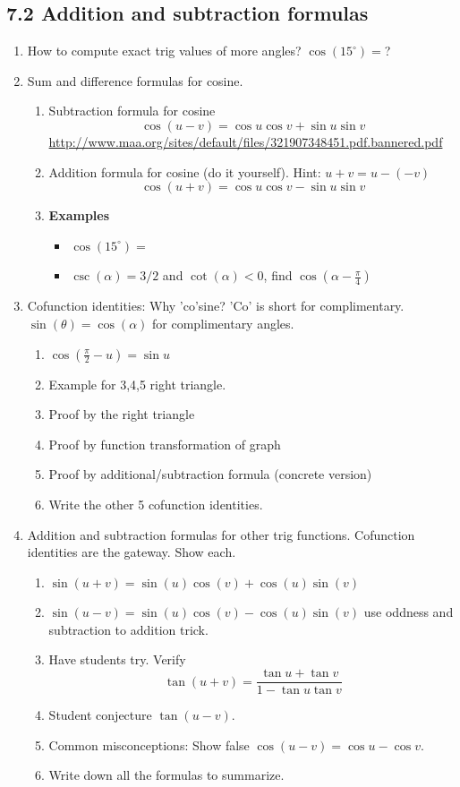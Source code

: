 \documentclass{article}
\begin{document}
\subsection{7.2 Addition and subtraction formulas}
\begin{enumerate}

\item How to compute exact trig values of more angles? $\cos (15^\circ)=$?

\item Sum and difference formulas for cosine.
\begin{enumerate}
\item Subtraction formula for cosine
$$
\cos(u-v) = \cos u \cos v+\sin u \sin v
$$
\url{http://www.maa.org/sites/default/files/321907348451.pdf.bannered.pdf}
\item Addition formula for cosine (do it yourself). Hint: $u+v=u-(-v)$
$$
\cos(u+v) = \cos u \cos v-\sin u \sin v
$$
\item {\bf Examples} 
\begin{itemize}
\item $\cos(15^\circ)=$
\item $\csc (\alpha) = 3/2$ and $\cot(\alpha) <0$, find $\cos(\alpha - \frac{\pi}{4})$
\end{itemize}
\end{enumerate}

\item Cofunction identities: Why 'co'sine? 'Co' is short for complimentary. $\sin(\theta)=\cos(\alpha)$ for complimentary angles.
\begin{enumerate}
\item $\cos(\frac{\pi}{2}-u) = \sin u$
\item Example for 3,4,5 right triangle.
\item Proof by the right triangle
\item Proof by function transformation of graph
\item Proof by additional/subtraction formula (concrete version)
\item Write the other 5 cofunction identities.
\end{enumerate}

\item Addition and subtraction formulas for other trig functions. Cofunction identities are the gateway. Show each.
\begin{enumerate}
\item $\sin (u+v)=\sin(u)\cos(v)+\cos(u)\sin(v)$
\item $\sin (u-v)=\sin(u)\cos(v)-\cos(u)\sin(v)$ use oddness and subtraction to addition trick.
\item Have students try. Verify
$$
\tan (u+v) = \frac{\tan u +\tan v}{1-\tan u\tan v}
$$
\item Student conjecture $\tan(u-v)$.
\item Common misconceptions: Show false $\cos(u-v) = \cos u - \cos v$.
\item Write down all the formulas to summarize.


\end{enumerate}
\end{enumerate}
\end{document}
